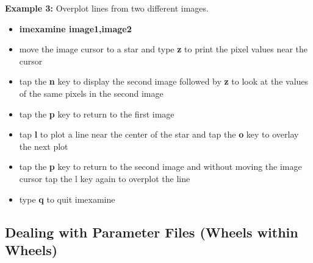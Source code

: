 \noindent
{\bf Example 3:} Overplot lines from two different images.
 
\begin{itemize}
\item {\bf imexamine image1,image2}
\item move the image cursor to a star and type {\bf z} to print the
pixel values near the cursor
\item tap the {\bf n} key to display the second image followed by {\bf z}
to look at the values of the same pixels in the second
image
\item tap the {\bf p} key to return to the first image
\item tap {\bf l} to plot a line near the center of the star and tap
the {\bf o} key to overlay the next plot
\item tap the {\bf p} key to return to the second image and without
moving the image cursor tap the l key again to overplot
the line
\item type {\bf q} to quit imexamine
\end{itemize}
 
\subsection{Dealing with Parameter Files (Wheels within Wheels)}
 
